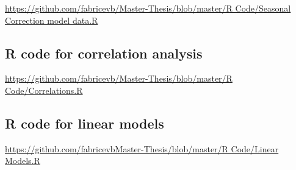 \documentclass[12pt,a4paper,oneside]{book}
\begin{document}
\href{https://github.com/fabricevb/Master-Thesis/blob/master/R Code/Seasonal Correction model data.R}{https://github.com/fabricevb/Master-Thesis/blob/master/R Code/Seasonal Correction model data.R}


\subsection*{R code for correlation analysis}

\href{https://github.com/fabricevb/Master-Thesis/blob/master/R Code/Correlations.R}{https://github.com/fabricevb/Master-Thesis/blob/master/R Code/Correlations.R}




\subsection*{R code for linear models}

\href{https://github.com/fabricevb/Master-Thesis/blob/master/R Code/Linear Models.R}{https://github.com/fabricevbMaster-Thesis/blob/master/R Code/Linear Models.R}


\newpage
\end{document}
